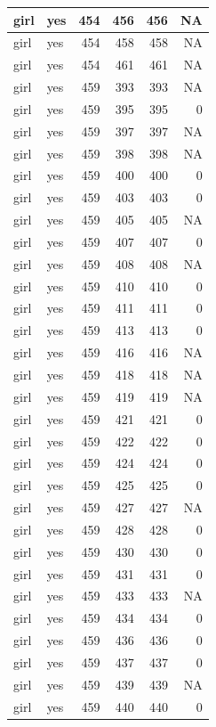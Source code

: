 \documentclass[man]{apa6}
\begin{document}
\begin{tabular}{l|l|r|r|r|r}
\hline
girl & yes & 454 & 456 & 456 & NA\\
\hline
girl & yes & 454 & 458 & 458 & NA\\
\hline
girl & yes & 454 & 461 & 461 & NA\\
\hline
girl & yes & 459 & 393 & 393 & NA\\
\hline
girl & yes & 459 & 395 & 395 & 0\\
\hline
girl & yes & 459 & 397 & 397 & NA\\
\hline
girl & yes & 459 & 398 & 398 & NA\\
\hline
girl & yes & 459 & 400 & 400 & 0\\
\hline
girl & yes & 459 & 403 & 403 & 0\\
\hline
girl & yes & 459 & 405 & 405 & NA\\
\hline
girl & yes & 459 & 407 & 407 & 0\\
\hline
girl & yes & 459 & 408 & 408 & NA\\
\hline
girl & yes & 459 & 410 & 410 & 0\\
\hline
girl & yes & 459 & 411 & 411 & 0\\
\hline
girl & yes & 459 & 413 & 413 & 0\\
\hline
girl & yes & 459 & 416 & 416 & NA\\
\hline
girl & yes & 459 & 418 & 418 & NA\\
\hline
girl & yes & 459 & 419 & 419 & NA\\
\hline
girl & yes & 459 & 421 & 421 & 0\\
\hline
girl & yes & 459 & 422 & 422 & 0\\
\hline
girl & yes & 459 & 424 & 424 & 0\\
\hline
girl & yes & 459 & 425 & 425 & 0\\
\hline
girl & yes & 459 & 427 & 427 & NA\\
\hline
girl & yes & 459 & 428 & 428 & 0\\
\hline
girl & yes & 459 & 430 & 430 & 0\\
\hline
girl & yes & 459 & 431 & 431 & 0\\
\hline
girl & yes & 459 & 433 & 433 & NA\\
\hline
girl & yes & 459 & 434 & 434 & 0\\
\hline
girl & yes & 459 & 436 & 436 & 0\\
\hline
girl & yes & 459 & 437 & 437 & 0\\
\hline
girl & yes & 459 & 439 & 439 & NA\\
\hline
girl & yes & 459 & 440 & 440 & 0\\

\end{tabular}
\end{document}

